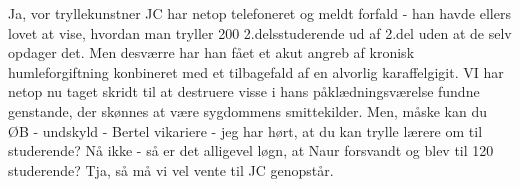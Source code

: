 \documentclass[a4paper,11pt]{article}
\begin{document}
\begin{sketch}

 Ja, vor tryllekunstner JC har netop telefoneret og meldt forfald - han havde ellers lovet at vise, hvordan man tryller 200 2.delsstuderende ud af 2.del uden at de selv opdager det.  Men desværre har han fået et akut angreb af kronisk humleforgiftning konbineret med et tilbagefald af en alvorlig karaffelgigit.  VI har netop nu taget skridt til at destruere visse i hans påklædningsværelse fundne genstande, der skønnes at være sygdommens smittekilder.  Men, måske kan du ØB - undskyld - Bertel vikariere - jeg har hørt, at du kan trylle lærere om til studerende?  Nå ikke - så er det alligevel løgn, at Naur forsvandt og blev til 120 studerende?  Tja, så må vi vel vente til JC genopstår.

\end{sketch}
\end{document}
